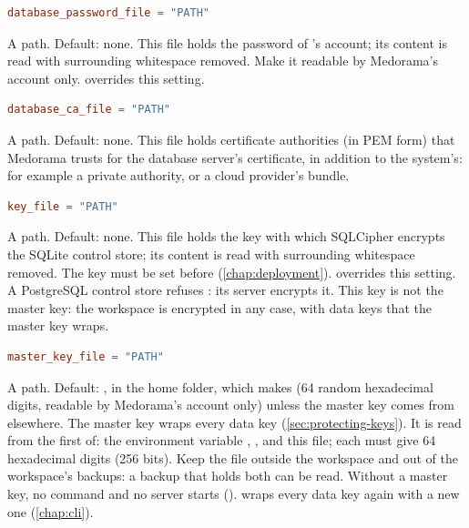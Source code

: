 \begin{lstlisting}[style=signature,language=TOML]
database_password_file = "PATH"
\end{lstlisting}
A path. Default: none. This file holds the password of 's account; its
content is read with surrounding whitespace removed. Make it readable by Medorama's account
only.  overrides this setting.

\begin{lstlisting}[style=signature,language=TOML]
database_ca_file = "PATH"
\end{lstlisting}
A path. Default: none. This file holds certificate authorities (in PEM form) that Medorama
trusts for the database server's certificate, in addition to the system's: for example a private
authority, or a cloud provider's bundle.

\begin{lstlisting}[style=signature,language=TOML]
key_file = "PATH"
\end{lstlisting}
A path. Default: none. This file holds the key with which SQLCipher encrypts the SQLite control
store; its content is read with surrounding whitespace removed. The key must be set before
 (\cref{chap:deployment}).  overrides this setting. A PostgreSQL
control store refuses : its server encrypts it. This key is not the master key:
the workspace is encrypted in any case, with data keys that the master key wraps.

\begin{lstlisting}[style=signature,language=TOML]
master_key_file = "PATH"
\end{lstlisting}
A path. Default: , in the home folder, which  makes (64 random
hexadecimal digits, readable by Medorama's account only) unless the master key comes from
elsewhere. The master key wraps every data key (\cref{sec:protecting-keys}). It is read from the
first of: the environment variable , ,
and this file; each must give 64 hexadecimal digits (256 bits). Keep the file outside the
workspace and out of the workspace's backups: a backup that holds both can be read. Without a
master key, no command and no server starts ().  wraps every data key
again with a new one (\cref{chap:cli}).

